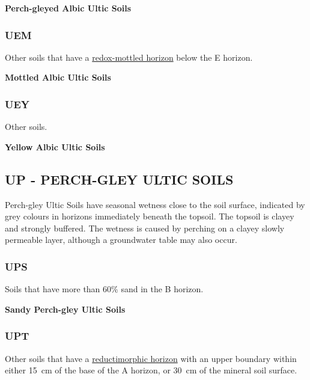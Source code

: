 \documentclass[
  letterpaper,
  DIV=11,
  numbers=noendperiod]{scrreprt}
\begin{document}
\textbf{Perch-gleyed Albic Ultic Soils}

\hypertarget{sec-key-UEM}{%
\subsubsection{\texorpdfstring{\textbf{UEM}}{UEM}}\label{sec-key-UEM}}

Other soils that have a \protect\hyperlink{sec-diag-redmh}{redox-mottled
horizon} below the E horizon.

\textbf{Mottled Albic Ultic Soils}

\hypertarget{sec-key-UEY}{%
\subsubsection{\texorpdfstring{\textbf{UEY}}{UEY}}\label{sec-key-UEY}}

Other soils.

\textbf{Yellow Albic Ultic Soils}

\hypertarget{sec-UP}{%
\subsection{\texorpdfstring{\textbf{UP} - PERCH-GLEY ULTIC
SOILS}{UP - PERCH-GLEY ULTIC SOILS}}\label{sec-UP}}

Perch-gley Ultic Soils have seasonal wetness close to the soil surface,
indicated by grey colours in horizons immediately beneath the topsoil.
The topsoil is clayey and strongly buffered. The wetness is caused by
perching on a clayey slowly permeable layer, although a groundwater
table may also occur.

\hypertarget{sec-key-UPS}{%
\subsubsection{\texorpdfstring{\textbf{UPS}}{UPS}}\label{sec-key-UPS}}

Soils that have more than 60\% sand in the B horizon.

\textbf{Sandy Perch-gley Ultic Soils}

\hypertarget{sec-key-UPT}{%
\subsubsection{\texorpdfstring{\textbf{UPT}}{UPT}}\label{sec-key-UPT}}

Other soils that have a
\protect\hyperlink{sec-diag-redmh}{reductimorphic horizon} with an upper
boundary within either 15~cm of the base of the A horizon, or 30~cm of
the mineral soil surface.
\end{document}

